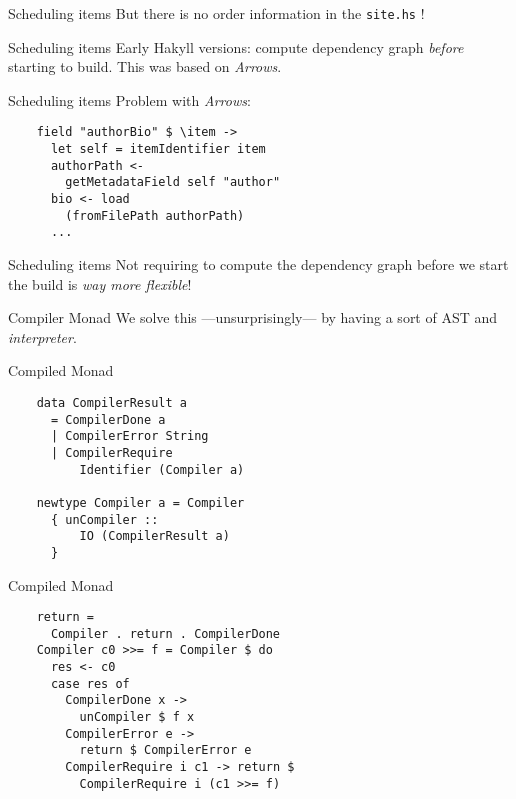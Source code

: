\documentclass[20pt]{beamer}
\newcommand{\vspaced}{
    \vspace{5mm}
}
\newcommand{\code}[1]{
    \texttt{\small{#1}}
}
\begin{document}
\begin{frame}{Scheduling items}
    But there is no order information in the \code{site.hs}!
\end{frame}

\begin{frame}{Scheduling items}
    Early Hakyll versions: compute dependency graph \emph{before} starting to
    build.  This was based on \emph{Arrows}.
\end{frame}

\begin{frame}[fragile]{Scheduling items}
    Problem with \emph{Arrows}: \\
    \vspaced
    \begin{lstlisting}
    field "authorBio" $ \item ->
      let self = itemIdentifier item
      authorPath <-
        getMetadataField self "author"
      bio <- load
        (fromFilePath authorPath)
      ...
    \end{lstlisting}
\end{frame}

\begin{frame}{Scheduling items}
    Not requiring to compute the dependency graph before we start the build is
    \emph{way more flexible}!
\end{frame}

\begin{frame}{Compiler Monad}
    We solve this ---unsurprisingly--- by having a sort of AST and
    \emph{interpreter}.
\end{frame}

\begin{frame}[fragile]{Compiled Monad}
    \begin{lstlisting}
    data CompilerResult a
      = CompilerDone a
      | CompilerError String
      | CompilerRequire
          Identifier (Compiler a)

    newtype Compiler a = Compiler
      { unCompiler ::
          IO (CompilerResult a)
      }
    \end{lstlisting}
\end{frame}

\begin{frame}[fragile]{Compiled Monad}
    \begin{lstlisting}
    return =
      Compiler . return . CompilerDone
    Compiler c0 >>= f = Compiler $ do
      res <- c0
      case res of
        CompilerDone x ->
          unCompiler $ f x
        CompilerError e ->
          return $ CompilerError e
        CompilerRequire i c1 -> return $
          CompilerRequire i (c1 >>= f)
    \end{lstlisting}
\end{frame}
\end{document}
